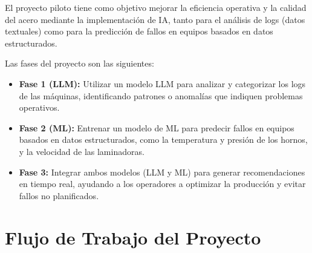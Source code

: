 El proyecto piloto tiene como objetivo mejorar la eficiencia operativa y la calidad del acero mediante la implementación de IA, tanto para el análisis de logs (datos textuales) como para la predicción de fallos en equipos basados en datos estructurados. 

Las fases del proyecto son las siguientes:

\begin{itemize}
    \item \textbf{Fase 1 (LLM):} Utilizar un modelo LLM para analizar y categorizar los logs de las máquinas, identificando patrones o anomalías que indiquen problemas operativos.
    \item \textbf{Fase 2 (ML):} Entrenar un modelo de ML para predecir fallos en equipos basados en datos estructurados, como la temperatura y presión de los hornos, y la velocidad de las laminadoras.
    \item \textbf{Fase 3:} Integrar ambos modelos (LLM y ML) para generar recomendaciones en tiempo real, ayudando a los operadores a optimizar la producción y evitar fallos no planificados.
\end{itemize}

\section{Flujo de Trabajo del Proyecto}

